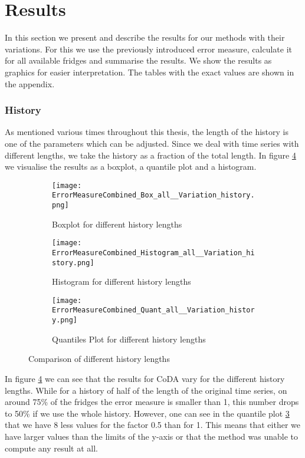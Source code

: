 \section{Results}
\label{sec:Results}

In this section we present and describe the results for our methods with their variations. For this we use the previously introduced error measure, calculate it for all available fridges and summarise the results. We show the results as graphics for easier interpretation. The tables with the exact values are shown in the appendix. 

\subsubsection{History}
\label{sec:History}

As mentioned various times throughout this thesis, the length of the history is one of the parameters which can be adjusted. Since we deal with time series with different lengths, we take the history as a fraction of the total length. In figure \ref{fig:History Comp1} we visualise the results as a boxplot, a quantile plot and a histogram. 

\begin{figure}[htb!]
\centering
\begin{subfigure}[b]{0.45\textwidth}
\texttt{[image: ErrorMeasureCombined\_Box\_all\_\_Variation\_history.png]}
\caption{Boxplot for different history lengths}
\label{fig:History Box}
\end{subfigure}
\hfill
\begin{subfigure}[b]{0.45\textwidth}
\texttt{[image: ErrorMeasureCombined\_Histogram\_all\_\_Variation\_history.png]}
\caption{Histogram for different history lengths}
\label{fig:History Hist}
\end{subfigure}
\hfill
\begin{subfigure}[b]{0.8\textwidth}
\texttt{[image: ErrorMeasureCombined\_Quant\_all\_\_Variation\_history.png]}
\caption{Quantiles Plot for different history lengths}
\label{fig:History Quant}
\end{subfigure}
\caption{Comparison of different history lengths}
\label{fig:History Comp1}
\end{figure}

In figure \ref{fig:History Comp1} we can see that the results for CoDA vary for the different history lengths. While for a history of half of the length of the original time series, on around 75\% of the fridges the error measure is smaller than 1, this number drops to 50\% if we use the whole history. However, one can see in the quantile plot \ref{fig:History Quant} that we have 8 less values for the factor 0.5 than for 1. This means that either we have larger values than the limits of the y-axis or that the method was unable to compute any result at all. 

